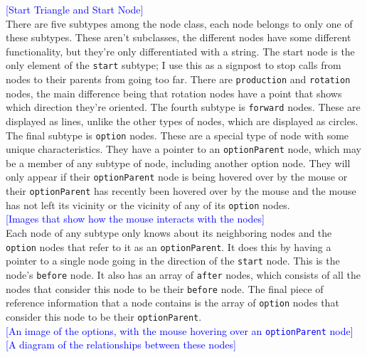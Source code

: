 \documentclass[12pt,twoside]{reedthesis}
\newcommand{\code}[1]{\texttt{#1}}
\begin{document}
	\textcolor{blue}{[Start Triangle and Start Node]}\\
	
	There are five subtypes among the node class, each node belongs to only one of these subtypes. These aren't subclasses, the different nodes have some different functionality, but they're only differentiated with a string. The start node is the only element of the \code{start} subtype; I use this as a signpost to stop calls from nodes to their parents from going too far. There are \code{production} and \code{rotation} nodes, the main difference being that rotation nodes have a point that shows which direction they're oriented. The fourth subtype is \code{forward} nodes. These are displayed as lines, unlike the other types of nodes, which are displayed as circles. The final subtype is \code{option} nodes. These are a special type of node with some unique characteristics. They have a pointer to an \code{optionParent} node, which may be a member of any subtype of node, including another option node. They will only appear if their \code{optionParent} node is being hovered over by the mouse or their \code{optionParent} has recently been hovered over by the mouse and the mouse has not left its vicinity or the vicinity of any of its \code{option} nodes.\\
	
	\textcolor{blue}{[Images that show how the mouse interacts with the nodes]}\\
	
	Each node of any subtype only knows about its neighboring nodes and the \code{option} nodes that refer to it as an \code{optionParent}. It does this by having a pointer to a single node going in the direction of the \code{start} node. This is the node's \code{before} node. It also has an array of \code{after} nodes, which consists of all the nodes that consider this node to be their \code{before} node. The final piece of reference information that a node contains is the array of \code{option} nodes that consider this node to be their \code{optionParent}.\\
	
	\textcolor{blue}{[An image of the options, with the mouse hovering over an \code{optionParent} node]}\\
	
	\textcolor{blue}{[A diagram of the relationships between these nodes]}\\
	
\end{document}
